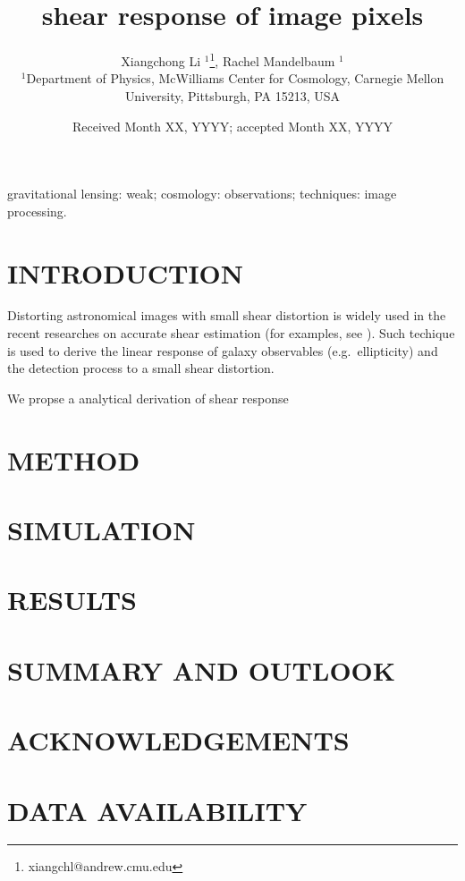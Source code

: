 \documentclass[fleqn,usenatbib]{mnras}
\title[pixel's shear response]{shear response of image pixels}
\author[]{
    Xiangchong Li $^{1}$\thanks{xiangchl@andrew.cmu.edu},
    Rachel Mandelbaum  $^{1}$
    \\
$^{1}$Department of Physics, McWilliams Center for Cosmology, Carnegie Mellon
University, Pittsburgh, PA 15213, USA\\
}
\date{Received Month XX, YYYY; accepted Month XX, YYYY}
\begin{document}
\label{firstpage}
\pagerange{\pageref{firstpage}--\pageref{lastpage}}
\maketitle


\begin{abstract}
\end{abstract}

\begin{keywords}
gravitational lensing: weak; cosmology: observations; techniques: image
processing.
\end{keywords}

\section{INTRODUCTION}
\label{sec:Intro}

Distorting astronomical images with small shear distortion is widely used in
the recent researches on accurate shear estimation (for examples, see
\citealt{metacal-Huff2017,metacal-Sheldon2017,metaDet-Sheldon2020}). Such
techique is used to derive the linear response of galaxy observables (e.g.\
ellipticity) and the detection process to a small shear distortion.

We propse a analytical derivation of shear response



\section{METHOD}
\label{sec:Method}


\section{SIMULATION}
\label{sec:sim}


\section{RESULTS}
\label{sec:res}


\section{SUMMARY AND OUTLOOK}
\label{sec:Summary}


\section*{ACKNOWLEDGEMENTS}


\section*{DATA AVAILABILITY}




\appendix


\label{lastpage}
\end{document}
